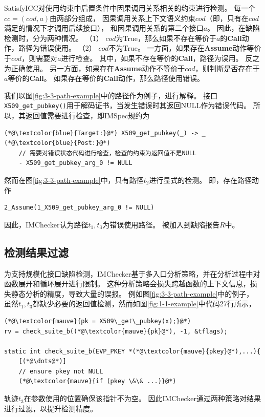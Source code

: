 SatisfyICC对使用约束中后置条件中因果调用关系相关的约束进行检测。
每一个$cc=(cod, a)$由两部分组成，
因果调用关系上下文语义约束$cod$（即，只有在$cod$满足的情况下才调用后续接口），
和因果调用关系的第二个接口$a$。
因此，在缺陷检测时，分为两种情况。
（1）
$cod$为True，那么如果不存在等价于$a$的\textbf{Call}动作，路径为错误使用。
（2）
$cod$不为True。
一方面，如果存在\textbf{Assume}动作等价于$cod$，则需要对$a$进行检查。
其中，如果不存在等价的\textbf{Call}，路径为误用。
反之为正确使用。
另一方面，如果存在\textbf{Assume}动作不等价于$cod$，则判断是否存在于$a$等价的\textbf{Call}。
如果存在等价的\textbf{Call}动作，那么路径使用错误。

我们以图\ref{fig:3-3-path-example}中的路径作为例子，进行解释。
接口\texttt{X509\_get\_pubkey()}用于解码证书，当发生错误时其返回NULL作为错误代码。
所以，其返回值需要进行检查，即IMSpec规约为
\begin{lstlisting}[language={[ANSI]C},
basicstyle=\linespread{0.8}\listingsfont,
numbers=none,
xleftmargin=.15\textwidth]
(*@\textcolor{blue}{Target:}@*) X509_get_pubkey(_) -> _
(*@\textcolor{blue}{Post:}@*) 
	// 需要对错误状态代码进行检查，检查的约束为返回值不是NULL
	- X509_get_pubkey_arg_0 != NULL
\end{lstlisting}
然而在图\ref{fig:3-3-path-example}中，只有路径$t_2$进行显式的检测。
即，存在路径动作
\begin{lstlisting}[language={[ANSI]C},
basicstyle=\linespread{0.8}\listingsfont,
numbers=none,
xleftmargin=.15\textwidth]
2_Assume(1_X509_get_pubkey_arg_0 != NULL)
\end{lstlisting}
因此，IMChecker认为路径$t_1, t_3$为错误使用路径。
被加入到缺陷报告$R$中。

\subsection{检测结果过滤}
为支持规模化接口缺陷检测，IMChecker基于多入口分析策略，并在分析过程中对函数展开和循环展开进行限制。
这种分析策略会损失跨越函数的上下文信息，损失静态分析的精度，导致大量的误报。
例如图\ref{fig:3-3-path-example}中的例子，
虽然$t_1, t_3$都缺少必要的返回值检测，然而如图\ref{fig:1-1-example}中代码27行所示，
\begin{lstlisting}[language={[ANSI]C},
basicstyle=\linespread{0.7}\listingsfont,
numbers=none,
xleftmargin=.15\textwidth]
(*@\textcolor{mauve}{pk = X509\_get\_pubkey(x);}@*)
rv = check_suite_b((*@\textcolor{mauve}{pk}@*), -1, &tflags);
	
static int check_suite_b(EVP_PKEY *(*@\textcolor{mauve}{pkey}@*),...){
	[(*@\dots@*)]
	// ensure pkey not NULL
	(*@\textcolor{mauve}{if (pkey \&\& ...)}@*)
\end{lstlisting}
轨迹$t_3$在参数使用的位置确保该指针不为空。
因此IMChecker通过两种策略对结果进行过滤，以提升检测精度。


